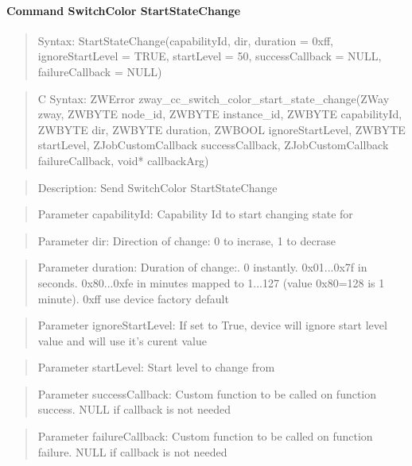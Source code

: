 \paragraph{Command SwitchColor StartStateChange}
\begin{quote}Syntax: StartStateChange(capabilityId, dir, duration = 0xff, ignoreStartLevel = TRUE, startLevel = 50, successCallback = NULL, failureCallback = NULL)\end{quote}
\begin{quote}C Syntax: ZWError zway\_cc\_switch\_color\_start\_state\_change(ZWay zway, ZWBYTE node\_id, ZWBYTE instance\_id, ZWBYTE capabilityId, ZWBYTE dir, ZWBYTE duration, ZWBOOL ignoreStartLevel, ZWBYTE startLevel, ZJobCustomCallback successCallback, ZJobCustomCallback failureCallback, void* callbackArg)\end{quote}
\begin{quote}Description: Send SwitchColor StartStateChange\end{quote}
\begin{quote}Parameter capabilityId: Capability Id to start changing state for\end{quote}
\begin{quote}Parameter dir: Direction of change: 0 to incrase, 1 to decrase\end{quote}
\begin{quote}Parameter duration: Duration of change:. 0 instantly. 0x01...0x7f in seconds. 0x80...0xfe in minutes mapped to 1...127 (value 0x80=128 is 1 minute). 0xff use device factory default\end{quote}
\begin{quote}Parameter ignoreStartLevel: If set to True, device will ignore start level value and will use it's curent value\end{quote}
\begin{quote}Parameter startLevel: Start level to change from\end{quote}
\begin{quote}Parameter successCallback: Custom function to be called on function success. NULL if callback is not needed\end{quote}
\begin{quote}Parameter failureCallback: Custom function to be called on function failure. NULL if callback is not needed\end{quote}


